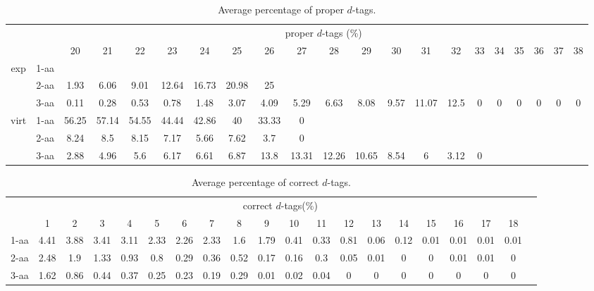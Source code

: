 \begin{table}[h]\tiny
\vspace{3mm}
{\centering
\begin{center}
\begin{tabular}{|c|l|c|c|c|c|c|c|c|c|c|c|c|c|c|c|c|c|c|c|c|}
  \hline
  \multicolumn{2}{|c|}{ } & \multicolumn{ 19 }{|c|}{ proper $d$-tags (\%)} \\
  \cline{3- 21}
  \multicolumn{2}{|c|}{ }  & 20 & 21 & 22 & 23 & 24 & 25 & 26 & 27 & 28 & 29 & 30 & 31 & 32 & 33 & 34 & 35 & 36 & 37 & 38\\
  \hline
  \multirow{3}{*}{exp}
&  1-aa  &  &  &  &  &  &  &  &  &  &  &  &  &  &  &  &  &  &  & \\
&  2-aa  & 1.93 & 6.06 & 9.01 & 12.64 & 16.73 & 20.98 & 25 &  &  &  &  &  &  &  &  &  &  &  & \\
&  3-aa  & 0.11 & 0.28 & 0.53 & 0.78 & 1.48 & 3.07 & 4.09 & 5.29 & 6.63 & 8.08 & 9.57 & 11.07 & 12.5 & 0 & 0 & 0 & 0 & 0 & 0\\
 \hline
  \multirow{3}{*}{virt} 
&  1-aa  & 56.25 & 57.14 & 54.55 & 44.44 & 42.86 & 40 & 33.33 & 0 &  &  &  &  &  &  &  &  &  &  & \\
&  2-aa  & 8.24 & 8.5 & 8.15 & 7.17 & 5.66 & 7.62 & 3.7 & 0 &  &  &  &  &  &  &  &  &  &  & \\
&  3-aa  & 2.88 & 4.96 & 5.6 & 6.17 & 6.61 & 6.87 & 13.8 & 13.31 & 12.26 & 10.65 & 8.54 & 6 & 3.12 & 0 &  &  &  &  & \\
 \hline
\end{tabular}
\end{center}
\par}
\centering

\caption{ Average percentage of proper $d$-tags.}

\vspace{3mm}
\label{table:proper-d-tags}
\end{table}
\begin{table}[h]\tiny
\vspace{3mm}
{\centering
\begin{center}
\begin{tabular}{|l|c|c|c|c|c|c|c|c|c|c|c|c|c|c|c|c|c|c|c|}
  \hline
  & \multicolumn{ 18 }{|c|}{correct $d$-tags(\%)} \\
  \cline{2- 19}
    & 1 & 2 & 3 & 4 & 5 & 6 & 7 & 8 & 9 & 10 & 11 & 12 & 13 & 14 & 15 & 16 & 17 & 18\\
  \hline
1-aa  & 4.41 & 3.88 & 3.41 & 3.11 & 2.33 & 2.26 & 2.33 & 1.6 & 1.79 & 0.41 & 0.33 & 0.81 & 0.06 & 0.12 & 0.01 & 0.01 & 0.01 & 0.01\\
2-aa  & 2.48 & 1.9 & 1.33 & 0.93 & 0.8 & 0.29 & 0.36 & 0.52 & 0.17 & 0.16 & 0.3 & 0.05 & 0.01 & 0 & 0 & 0.01 & 0.01 & 0\\
3-aa  & 1.62 & 0.86 & 0.44 & 0.37 & 0.25 & 0.23 & 0.19 & 0.29 & 0.01 & 0.02 & 0.04 & 0 & 0 & 0 & 0 & 0 & 0 & 0\\
 \hline
\end{tabular}
\end{center}
\par}
\centering
\caption{ Average percentage of correct $d$-tags.}
\vspace{3mm}
\label{table:correct-d-tags}
\end{table}
